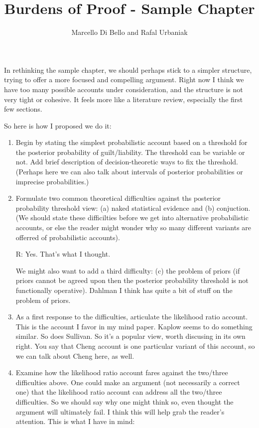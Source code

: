 \documentclass[10pt,dvipsnames,enabledeprecatedfontcommands]{scrartcl}
\title{Burdens of Proof - Sample Chapter}
\author{Marcello Di Bello and Rafal Urbaniak}
\date{}
\begin{document}
\maketitle

\tableofcontents

In rethinking the sample chapter, we should perhaps stick to a simpler
structure, trying to offer a more focused and compelling argument. Right
now I think we have too many possible accounts under consideration, and
the structure is not very tight or cohesive. It feels more like a
literature review, especially the first few sections.

So here is how I proposed we do it:

\begin{enumerate}

\item Begin by stating the simplest probabilistic account based on a threshold for the 
posterior probability of guilt/liability. The threshold can be variable or not. Add brief description of decision-theoretic ways to fix the threshold. (Perhaps here we can also 
talk about intervals of posterior probabilities or imprecise probabilities.) 


\item Formulate two common theoretical difficulties against ths posterior 
probability threshold view: (a) naked statistical evidence and (b) conjuction.
(We should state these difficilties before we get 
into alternative probabilistic accounts, or else the reader might 
wonder why so many different variants are offerred of probabilistic accounts). 

R: Yes. That's what I thought.


We might also want to add a third difficulty: (c) the problem of priors (if priors cannot be agreed 
upon then the posterior probability threshold is not functionally operative). Dahlman I think has quite a bit of stuff on the problem of priors. 

\item  As a first response to the difficulties, articulate the likelihood ratio account. 
This is the account I favor in my mind paper. Kaplow seems to do something similar. So does Sullivan. So it's a  popular view, worth discusing in its own right. You say that Cheng account is one particular variant of this account, so we can talk about Cheng here, as well.

\item Examine how the likelihood ratio account fares against the two/three difficulties above. One could make an argument (not necessarily a correct one) that the likelihood ratio account can address all the two/three difficulties. So we should say why one might think so, even thought the argument will ultimately fail. I think this will help grab the reader's attention. This is what I have in mind:


\end{enumerate}
\end{document}
